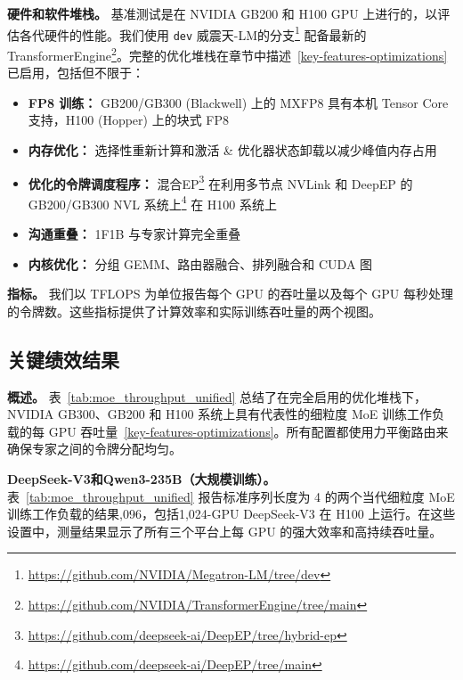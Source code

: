 \textbf{硬件和软件堆栈。}
基准测试是在 NVIDIA GB200 和 H100 GPU 上进行的，以评估各代硬件的性能。我们使用 \texttt{dev} 威震天-LM的分支\footnote{\url{https://github.com/NVIDIA/Megatron-LM/tree/dev}} 配备最新的 TransformerEngine\footnote{\url{https://github.com/NVIDIA/TransformerEngine/tree/main}}。完整的优化堆栈在章节中描述~\ref{key-features-optimizations} 已启用，包括但不限于：
\begin{itemize}[noitemsep,topsep=0pt]
    \item \textbf{FP8 训练：} GB200/GB300 (Blackwell) 上的 MXFP8 具有本机 Tensor Core 支持，H100 (Hopper) 上的块式 FP8
    \item \textbf{内存优化：} 选择性重新计算和激活 \& 优化器状态卸载以减少峰值内存占用
    \item \textbf{优化的令牌调度程序：} 混合EP\footnote{\url{https://github.com/deepseek-ai/DeepEP/tree/hybrid-ep}} 在利用多节点 NVLink 和 DeepEP 的 GB200/GB300 NVL 系统上\footnote{\url{https://github.com/deepseek-ai/DeepEP/tree/main}} 在 H100 系统上
    \item \textbf{沟通重叠：} 1F1B 与专家计算完全重叠
    \item \textbf{内核优化：} 分组 GEMM、路由器融合、排列融合和 CUDA 图
\end{itemize}

\textbf{指标。}
我们以 TFLOPS 为单位报告每个 GPU 的吞吐量以及每个 GPU 每秒处理的令牌数。这些指标提供了计算效率和实际训练吞吐量的两个视图。

\subsection{关键绩效结果}


\textbf{概述。}
表~\ref{tab:moe_throughput_unified} 总结了在完全启用的优化堆栈下，NVIDIA GB300、GB200 和 H100 系统上具有代表性的细粒度 MoE 训练工作负载的每 GPU 吞吐量~\ref{key-features-optimizations}。所有配置都使用力平衡路由来确保专家之间的令牌分配均匀。


\textbf{DeepSeek-V3和Qwen3-235B（大规模训练）。}
表~\ref{tab:moe_throughput_unified} 报告标准序列长度为 4 的两个当代细粒度 MoE 训练工作负载的结果{,}096，包括1{,}024-GPU DeepSeek-V3 在 H100 上运行。在这些设置中，测量结果显示了所有三个平台上每 GPU 的强大效率和高持续吞吐量。


